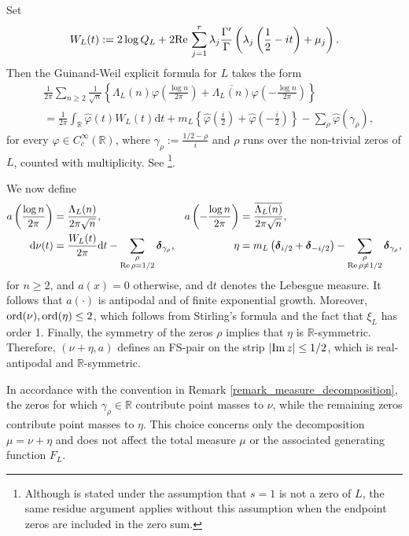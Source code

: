 \documentclass[a4paper,reqno,12pt]{amsart}
\renewcommand{\r}{\mathbb{R}}
\newcommand{\ft}{\widehat}
\newcommand{\bo}{\boldsymbol}
\newcommand{\ga}{\gamma}
\newcommand{\p}{\varphi}
\newcommand{\ord}{{\rm ord}}
\renewcommand{\d}{\mathrm{d}}
\newcommand{\ov}[1]{\overline{#1}}
\newcommand{\cd}{\cdot}
\newcommand{\1}{{\bf 1}}
\newcommand{\del}{{\bo \delta}}
\renewcommand{\Re}{{\rm Re}\,}
\renewcommand{\Im}{{\rm Im}\,}
\begin{document}
Set
\begin{equation*}
    W_L(t):=2\log Q_L+2\Re\sum_{j=1}^r
    \lambda_j\frac{\Gamma'}{\Gamma}
    \left(\lambda_j\left(\frac12-it\right)+\mu_j\right).
\end{equation*}
Then the Guinand-Weil explicit formula for $L$ takes the form
\begin{align}
\label{eq:Selberg_explicit_formula}
    &\frac{1}{2\pi}\sum_{n\geq2}\frac{1}{\sqrt n}
    \left\{
    \Lambda_L(n)\p\left(\frac{\log n}{2\pi}\right)
    +\ov{\Lambda_L(n)}\p\left(-\frac{\log n}{2\pi}\right)
    \right\}\\
    &=\frac{1}{2\pi}\int_{\r}\ft{\p}(t)W_L(t)\d t+m_L\left\{\ft{\p}\left(\frac{i}{2}\right)
    +\ft{\p}\left(-\frac{i}{2}\right)\right\}
    -\sum_{\rho}\ft{\p}(\ga_\rho),
\end{align}
for every $\p\in C_c^\infty(\r)$, where $\ga_\rho:=\frac{1/2-\rho}{i}$ and $\rho$ runs over the non-trivial zeros of $L$, counted with multiplicity. See \cite[Lemma~9, Eq.~(6.1)]{PS}\footnote{Although \cite[Lemma~9, Eq.~(6.1)]{PS} is stated under the assumption that $s=1$ is not a zero of $L$, the same residue argument applies without this assumption when the endpoint zeros are included in the zero sum.}.

We now define
\begin{align*}
    a\left(\frac{\log n}{2\pi}\right)
    &=\frac{\Lambda_L(n)}{2\pi\sqrt n},
    &
    a\left(-\frac{\log n}{2\pi}\right)
    &=\frac{\ov{\Lambda_L(n)}}{2\pi\sqrt n},\\
    \d\nu(t)
    &=\frac{W_L(t)}{2\pi}\d t
      -\sum_{\substack{\rho\\ \Re\rho=1/2}}\del_{\ga_\rho},
    &
    \eta
    &=m_L\left(\del_{i/2}+\del_{-i/2}\right)
      -\sum_{\substack{\rho\\ \Re\rho\neq1/2}}\del_{\ga_\rho},
\end{align*}
for $n\geq2$, and $a(x)=0$ otherwise, and $\d t$ denotes the Lebesgue measure. It follows that $a(\cd)$ is antipodal and of finite exponential growth. Moreover, $\ord(\nu),\ord(\eta)\leq2$, which follows from Stirling's formula and the fact that $\xi_L$ has order 1. Finally, the symmetry of the zeros $\rho$ implies that $\eta$ is $\r$-symmetric. Therefore, $(\nu+\eta,a)$ defines an FS-pair on the strip $|\Im{z}|\leq1/2$, which is real-antipodal and $\r$-symmetric.

In accordance with the convention in Remark \ref{remark_measure_decomposition}, the zeros for which $\ga_\rho\in\r$ contribute point masses to $\nu$, while the remaining zeros contribute point masses to $\eta$. This choice concerns only the decomposition $\mu=\nu+\eta$ and does not affect the total measure $\mu$ or the associated generating function $F_L$.
\end{document}
